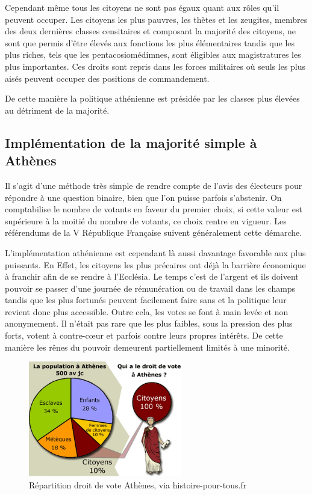 \documentclass[11pt,a4paper]{report}
\begin{document}
Cependant même tous les citoyens ne sont pas égaux quant aux rôles qu'il peuvent occuper.
Les citoyens les plus pauvres, les thètes et les zeugites, membres des deux dernières classes censitaires et composant la majorité des citoyens, ne sont que permis d'être élevés aux fonctions les plus élémentaires\nocite{wiki:thetes} tandis que les plus riches, tels que les pentacosiomédimnes, sont éligibles aux magistratures les plus importantes.\nocite{wiki:penta}
Ces droits sont repris dans les forces militaires où seuls les plus aisés peuvent occuper des positions de commandement.\nocite{aristote:constitathenes}

De cette manière la politique athénienne est présidée par les classes plus élevées au détriment de la majorité.

\newpage
\nocite{wiki:histdemo}
\subsection{Implémentation de la majorité simple à Athènes}
Il s'agit d'une méthode très simple de rendre compte de l'avis des électeurs pour répondre à une question binaire, bien que l'on puisse parfois s'abstenir.
On comptabilise le nombre de votants en faveur du premier choix, si cette valeur est supérieure à la moitié du nombre de votants, ce choix rentre en vigueur.
Les référendums de la V République Française suivent généralement cette démarche.

L'implémentation athénienne est cependant là aussi davantage favorable aux plus puissants.
En Effet, les citoyens les plus précaires ont déjà la barrière économique à franchir afin de se rendre à l'Ecclésia. Le temps c'est de l'argent et ils doivent pouvoir se passer d'une journée de rémunération ou de travail dans les champs tandis que les plus fortunés peuvent facilement faire sans et la politique leur revient donc plus accessible. Outre cela, les votes se font à main levée et non anonymement. Il n'était pas rare que les plus faibles, sous la pression des plus forts, votent à contre-cœur et parfois contre leurs propres intérêts. De cette manière les rênes du pouvoir demeurent partiellement limités à une minorité.

\begin{figure}[h]
	\centering
	\includegraphics[width=0.6\textwidth]{./images/droit-de-vote-athenes.jpg}
	\caption{Répartition droit de vote Athènes, via histoire-pour-tous.fr \cite{hpt:VoteAthene}}
	\label{Athene:DroitVote}
\end{figure}
\end{document}

